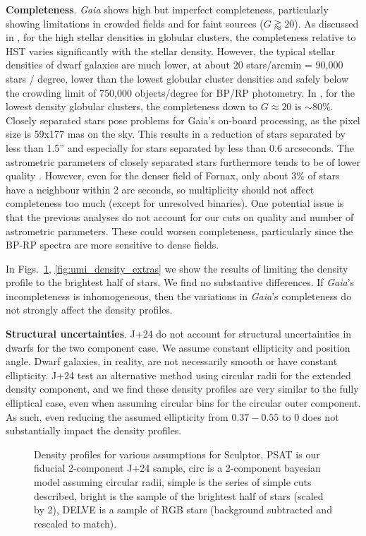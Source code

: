 \textbf{Completeness}. \emph{Gaia} shows high but imperfect
completeness, particularly showing limitations in crowded fields and for
faint sources (\(G\gtrapprox20\)). As discussed in
\citet{fabricius+2021}, for the high stellar densities in globular
clusters, the completeness relative to HST varies significantly with the
stellar density. However, the typical stellar densities of dwarf
galaxies are much lower, at about 20 stars/arcmin = 90,000 stars /
degree, lower than the lowest globular cluster densities and safely
below the crowding limit of 750,000 objects/degree for BP/RP photometry.
In \citet{fabricius+2021}, for the lowest density globular clusters, the
completeness down to \(G\approx 20\) is \(\sim 80\%\). Closely separated
stars pose problems for Gaia's on-board processing, as the pixel size is
59x177 mas on the sky. This results in a reduction of stars separated by
less than 1.5'' and especially for stars separated by less than 0.6
arcseconds. The astrometric parameters of closely separated stars
furthermore tends to be of lower quality \citep{fabricius+2021}.
However, even for the denser field of Fornax, only about 3\% of stars
have a neighbour within 2 arc seconds, so multiplicity should not affect
completeness too much (except for unresolved binaries). One potential
issue is that the previous analyses do not account for our cuts on
quality and number of astrometric parameters. These could worsen
completeness, particularly since the BP-RP spectra are more sensitive to
dense fields.

In Figs.~\ref{fig:scl_density_extras}, \ref{fig:umi_density_extras} we
show the results of limiting the density profile to the brightest half
of stars. We find no substantive differences. If \emph{Gaia}'s
incompleteness is inhomogeneous, then the variations in \emph{Gaia}'s
completeness do not strongly affect the density profiles.

\textbf{Structural uncertainties}. J+24 do not account for structural
uncertainties in dwarfs for the two component case. We assume constant
ellipticity and position angle. Dwarf galaxies, in reality, are not
necessarily smooth or have constant ellipticity. J+24 test an
alternative method using circular radii for the extended density
component, and we find these density profiles are very similar to the
fully elliptical case, even when assuming circular bins for the circular
outer component. As such, even reducing the assumed ellipticity from
\(0.37-0.55\) to 0 does not substantially impact the density profiles.

\begin{figure}
\centering
{}
\caption[Scl density comparison]{Density profiles for various
assumptions for Sculptor. PSAT is our fiducial 2-component J+24 sample,
circ is a 2-component bayesian model assuming circular radii, simple is
the series of simple cuts described, bright is the sample of the
brightest half of stars (scaled by 2), DELVE is a sample of RGB stars
(background subtracted and rescaled to
match).}\label{fig:scl_density_extras}
\end{figure}

